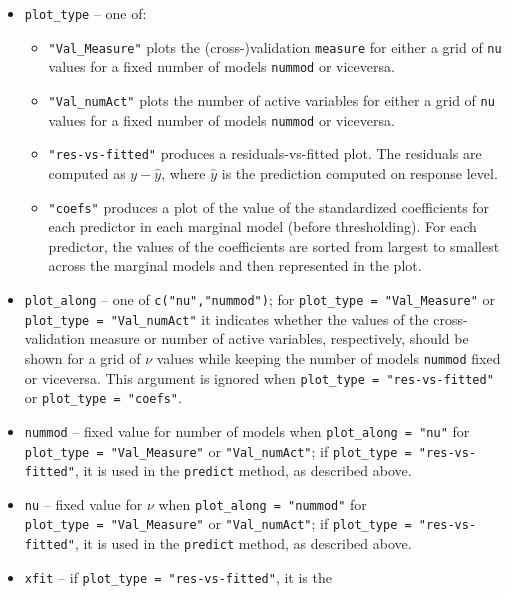 \documentclass[
  article]{jss}
\begin{document}
\begin{itemize}
\item
  \texttt{plot\_type} -- one of:

  \begin{itemize}
  \item
    \texttt{"Val\_Measure"} plots the (cross-)validation
    \texttt{measure} for either a grid of \texttt{nu} values for a fixed
    number of models \texttt{nummod} or viceversa.
  \item
    \texttt{"Val\_numAct"} plots the number of active variables for
    either a grid of \texttt{nu} values for a fixed number of models
    \texttt{nummod} or viceversa.
  \item
    \texttt{"res-vs-fitted"} produces a residuals-vs-fitted plot. The
    residuals are computed as \(y- \widehat y\), where \(\widehat y\) is
    the prediction computed on response level.
  \item
    \texttt{"coefs"} produces a plot of the value of the standardized
    coefficients for each predictor in each marginal model (before
    thresholding). For each predictor, the values of the coefficients
    are sorted from largest to smallest across the marginal models and
    then represented in the plot.
  \end{itemize}
\item
  \texttt{plot\_along} -- one of \texttt{c("nu","nummod")}; for
  \texttt{plot\_type\ =\ "Val\_Measure"} or
  \texttt{plot\_type\ =\ "Val\_numAct"} it indicates whether the values
  of the cross-validation measure or number of active variables,
  respectively, should be shown for a grid of \(\nu\) values while
  keeping the number of models \texttt{nummod} fixed or viceversa. This
  argument is ignored when \texttt{plot\_type\ =\ "res-vs-fitted"} or
  \texttt{plot\_type\ =\ "coefs"}.
\item
  \texttt{nummod} -- fixed value for number of models when
  \texttt{plot\_along\ =\ "nu"} for
  \texttt{plot\_type\ =\ "Val\_Measure"} or \texttt{"Val\_numAct"}; if
  \texttt{plot\_type\ =\ "res-vs-fitted"}, it is used in the
  \texttt{predict} method, as described above.
\item
  \texttt{nu} -- fixed value for \(\nu\) when
  \texttt{plot\_along\ =\ "nummod"} for
  \texttt{plot\_type\ =\ "Val\_Measure"} or \texttt{"Val\_numAct"}; if
  \texttt{plot\_type\ =\ "res-vs-fitted"}, it is used in the
  \texttt{predict} method, as described above.
\item
  \texttt{xfit} -- if \texttt{plot\_type\ =\ "res-vs-fitted"}, it is the

\end{itemize}
\end{document}
